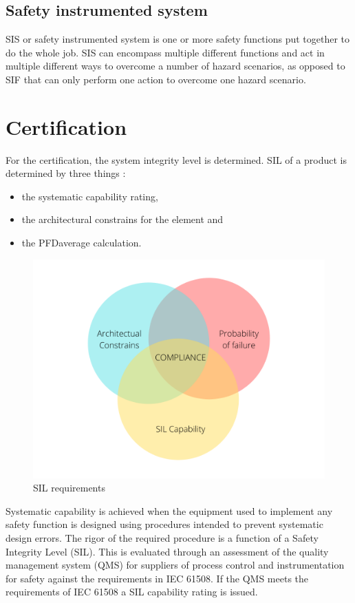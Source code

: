 \subsection{Safety instrumented system}
\label{sec:sis}

SIS or safety instrumented system is one or more safety functions put together to do the whole job. SIS can encompass multiple different functions and act in multiple different ways to overcome a number of hazard scenarios, as opposed to SIF that can only perform one action to overcome one hazard scenario.

\section{Certification}
\label{sec:certification}

For the certification, the system integrity level is determined. SIL of a product is determined by three things \citep{func_safety_fundamentals}:
\begin{itemize}

    \item the systematic capability rating,
    \item the architectural constrains for the element and
    \item the PFDaverage calculation.
    
\end{itemize}

\begin{figure}[H]

      \centering
      \includegraphics[width=0.7\linewidth]{images/sil_requirements.png}
      \caption{SIL requirements}
      \label{fig:sil_requirements}
    
\end{figure}

Systematic capability is achieved when the equipment used to implement any safety function is designed using procedures intended to prevent systematic design errors.  The rigor of the required procedure is a function of a Safety Integrity Level (SIL). This is evaluated through an assessment of the quality management system (QMS) for suppliers of process control and instrumentation for safety against the requirements in IEC 61508.  If the QMS meets the requirements of IEC 61508 a SIL capability rating is issued. 

